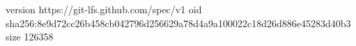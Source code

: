 version https://git-lfs.github.com/spec/v1
oid sha256:8e9d72cc26b458cb042796d256629a78d4a9a100022c18d26d886e45283d40b3
size 126358
